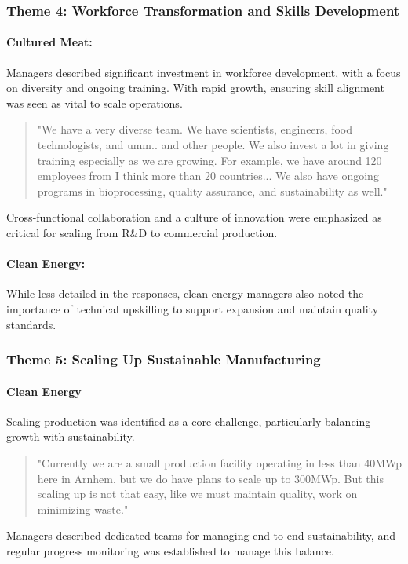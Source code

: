 \subsubsection{Theme 4: Workforce Transformation and Skills Development}
\paragraph{Cultured Meat:} Managers described significant investment in workforce development, with a focus on diversity and ongoing training. With rapid growth, ensuring skill alignment was seen as vital to scale operations.
\begin{quote}
	"We have a very diverse team. We have scientists, engineers, food technologists, and umm.. and other people. We also invest a lot in giving training especially as we are growing. For example, we have around 120 employees from I think more than 20 countries... We also have ongoing programs in bioprocessing, quality assurance, and sustainability as well."
\end{quote}
Cross-functional collaboration and a culture of innovation were emphasized as critical for scaling from R\&D to commercial production.

\paragraph{Clean Energy:} While less detailed in the responses, clean energy managers also noted the importance of technical upskilling to support expansion and maintain quality standards.

\subsubsection{Theme 5: Scaling Up Sustainable Manufacturing}
\paragraph{Clean Energy}
Scaling production was identified as a core challenge, particularly balancing growth with sustainability.
\begin{quote}
	"Currently we are a small production facility operating in less than 40MWp here in Arnhem, but we do have plans to scale up to 300MWp. But this scaling up is not that easy, like we must maintain quality, work on minimizing waste."
\end{quote}
Managers described dedicated teams for managing end-to-end sustainability, and regular progress monitoring was established to manage this balance.

